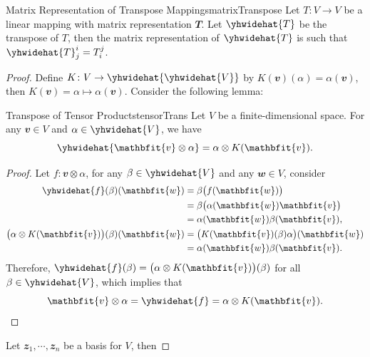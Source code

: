 \documentclass[math, code]{amznotes}
\theoremstyle{remark}
\begin{document}
\begin{probox}{Matrix Representation of Transpose Mappings}{matrixTranspose}
    Let $T \colon V \to V$ be a linear mapping with matrix representation $\mathbfit{T}$. Let $\yhwidehat{T}$ be the transpose of $T$, then the matrix representation of $\yhwidehat{T}$ is such that $\yhwidehat{T}^{i}_j = T^j_i$.
    \tcblower
    \begin{proof}
        Define $K \colon V \to \yhwidehat{\yhwidehat{V}}$ by $K(\mathbfit{v})(\alpha) = \alpha(\mathbfit{v})$, then $K(\mathbfit{v}) = \alpha \mapsto \alpha(\mathbfit{v})$. Consider the following lemma:
        \begin{lembox}{Transpose of Tensor Products}{tensorTrans}
            Let $V$ be a finite-dimensional space. For any $\mathbfit{v} \in V$ and $\alpha \in \yhwidehat{V}$, we have 
            \begin{equation*}
                \yhwidehat{\mathbfit{v} \otimes \alpha} = \alpha \otimes K(\mathbfit{v}).
            \end{equation*}
            \tcblower
            \begin{proof}
                Let $f \colon \mathbfit{v} \otimes \alpha$, for any $\beta \in \yhwidehat{V}$ and any $\mathbfit{w} \in V$, consider 
                \begin{align*}
                    \yhwidehat{f}(\beta)(\mathbfit{w}) & = \beta\bigl(f(\mathbfit{w})\bigr) \\
                    & = \beta\bigl(\alpha(\mathbfit{w})\mathbfit{v}\bigr) \\
                    & = \alpha(\mathbfit{w})\beta(\mathbfit{v}), \\
                    \bigl(\alpha \otimes K(\mathbfit{v})\bigr)(\beta)(\mathbfit{w}) & = \bigl(K(\mathbfit{v})(\beta)\alpha\bigr)(\mathbfit{w}) \\
                    & = \alpha(\mathbfit{w})\beta(\mathbfit{v}).
                \end{align*}     
                Therefore, $\yhwidehat{f}(\beta) =  \bigl(\alpha \otimes K(\mathbfit{v})\bigr)(\beta)$ for all $\beta \in \yhwidehat{V}$, which implies that 
                \begin{equation*}
                    \mathbfit{v} \otimes \alpha = \yhwidehat{f} = \alpha \otimes K(\mathbfit{v}).
                \end{equation*}
            \end{proof}
        \end{lembox}
        Let $\mathbfit{z}_1, \cdots, \mathbfit{z}_n$ be a basis for $V$, then 

\end{proof}
\end{probox}
\end{document}

